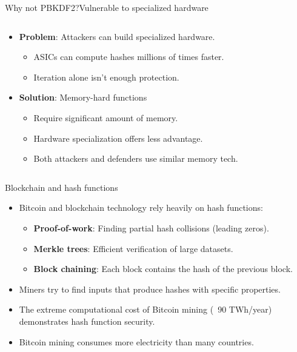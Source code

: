 \documentclass[aspectratio=169, lualatex, handout]{beamer}
\begin{document}
\begin{frame}{Why not PBKDF2?}{Vulnerable to specialized hardware}
	\begin{columns}[c]
		\begin{column}{0.6\textwidth}
			\begin{itemize}[<+->]
				\item \textbf{Problem}: Attackers can build specialized hardware.
				      \begin{itemize}
					      \item ASICs can compute hashes millions of times faster.
					      \item Iteration alone isn't enough protection.
				      \end{itemize}
				\item \textbf{Solution}: Memory-hard functions
				      \begin{itemize}
					      \item Require significant amount of memory.
					      \item Hardware specialization offers less advantage.
					      \item Both attackers and defenders use similar memory tech.
				      \end{itemize}
			\end{itemize}
		\end{column}
		\begin{column}{0.4\textwidth}
		\end{column}
	\end{columns}
\end{frame}

\begin{frame}{Blockchain and hash functions}
	\begin{itemize}[<+->]
		\item Bitcoin and blockchain technology rely heavily on hash functions:
		      \begin{itemize}
			      \item \textbf{Proof-of-work}: Finding partial hash collisions (leading zeros).
			      \item \textbf{Merkle trees}: Efficient verification of large datasets.
			      \item \textbf{Block chaining}: Each block contains the hash of the previous block.
		      \end{itemize}
		\item Miners try to find inputs that produce hashes with specific properties.
		\item The extreme computational cost of Bitcoin mining (~90 TWh/year) demonstrates hash function security.
		\item Bitcoin mining consumes more electricity than many countries.
	\end{itemize}
\end{frame}
\end{document}
